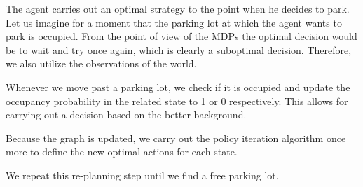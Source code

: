 
The agent carries out an optimal strategy to the point when he decides to
park. Let us imagine for a moment that the parking lot at which the agent
wants to park is occupied. From the point of view of the MDPs the optimal
decision would be to wait and try once again, which is clearly a suboptimal
decision. Therefore, we also utilize the observations of the world.

Whenever we move past a parking lot, we check if it is occupied and update
the occupancy probability in the related state to 1 or 0 respectively.
This allows for carrying out a decision based on the better background.

Because the graph is updated, we carry out the policy iteration algorithm
once more to define the new optimal actions for each state.

We repeat this re-planning step until we find a free parking lot.

